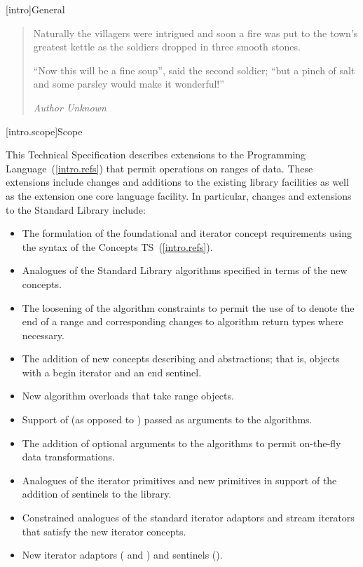 [intro]{General}

\begin{quote}
Naturally the villagers were intrigued and soon a fire was put to the town's greatest
kettle as the soldiers dropped in three smooth stones.

``Now this will be a fine soup'', said the second soldier;
``but a pinch of salt and some parsley would make it wonderful!''
\begin{flushright}
\textemdash \textit{Author Unknown}
\end{flushright}
\end{quote}

[intro.scope]{Scope}

\pnum
This Technical Specification describes extensions to the \Cpp
Programming Language~(\ref{intro.refs}) that
permit operations on ranges of data. These extensions include
changes and additions to the existing library facilities as well
as the extension one core language facility. In particular,
changes and extensions to the Standard Library include:

\begin{itemize}
\item The formulation of the foundational and iterator concept requirements
using the syntax of the Concepts TS~(\ref{intro.refs}).
\item Analogues of the Standard Library algorithms specified in terms of the new
concepts.
\item The loosening of the algorithm constraints to permit the use of
 to denote the end of a range and corresponding changes to algorithm
return types where necessary.
\item The addition of new concepts describing  and 
abstractions; that is, objects with a begin iterator and an end sentinel.
\item New algorithm overloads that take range objects.
\item Support of  (as opposed to )
passed as arguments to the algorithms.
\item The addition of optional  arguments to the algorithms to
permit on-the-fly data transformations.
\item Analogues of the iterator primitives and new primitives in support of the
addition of sentinels to the library.
\item Constrained analogues of the standard iterator adaptors and stream iterators
that satisfy the new iterator concepts.
\item New iterator adaptors ( and ) and
sentinels ().
\end{itemize}


